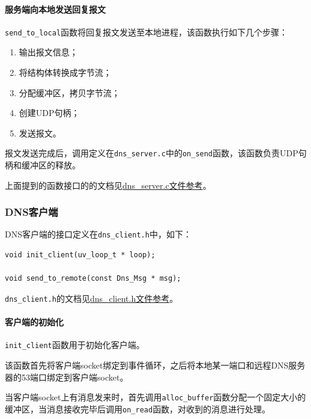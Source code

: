 \documentclass[lang=cn,11pt,a4paper,cite=authornum]{paper}
\begin{document}
\paragraph{服务端向本地发送回复报文}

\texttt{send_to_local}函数将回复报文发送至本地进程，该函数执行如下几个步骤：

\begin{enumerate}
    \item 输出报文信息；
    \item 将结构体转换成字节流；
    \item 分配缓冲区，拷贝字节流；
    \item 创建UDP句柄；
    \item 发送报文。
\end{enumerate}

报文发送完成后，调用定义在\texttt{dns_server.c}中的\texttt{on_send}函数，该函数负责UDP句柄和缓冲区的释放。

上面提到的函数接口的的文档见\href{run:./APIdoc/dns__server_8c.html}{dns\_server.c文件参考}。

\subsubsection{DNS客户端}

DNS客户端的接口定义在\texttt{dns_client.h}中，如下：

\begin{code}
\begin{verbatim}
void init_client(uv_loop_t * loop);

void send_to_remote(const Dns_Msg * msg);
\end{verbatim}
\end{code}

\texttt{dns_client.h}的文档见\href{run:./APIdoc/dns__client_8h.html}{dns\_client.h文件参考}。

\paragraph{客户端的初始化}

\texttt{init_client}函数用于初始化客户端。

该函数首先将客户端socket绑定到事件循环，之后将本地某一端口和远程DNS服务器的53端口绑定到客户端socket。

当客户端socket上有消息发来时，首先调用\texttt{alloc_buffer}函数分配一个固定大小的缓冲区，当消息接收完毕后调用\texttt{on_read}函数，对收到的消息进行处理。
\end{document}
